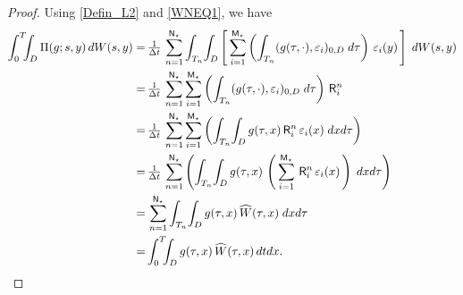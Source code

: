 \documentclass[10pt]{amsart}
\numberwithin{equation}{section}
\begin{document}
\begin{proof}
Using \eqref{Defin_L2} and \eqref{WNEQ1}, we have
\begin{equation*}
\begin{split}
\int_0^{{\scriptscriptstyle} T}\!\!\!\int_{{\scriptscriptstyle} D}\Pi(g;s,y)\,dW(s,y)=&\,
\tfrac{1}{\Delta{t}}\,\sum_{n=1}^{{\scriptscriptstyle}{\sf N}_{\star}}\int_{{\scriptscriptstyle} T_n}\!\int_{{\scriptscriptstyle} D}\left[
\,\sum_{i=1}^{{\scriptscriptstyle} {\sf M}_{\star}}
\left(\int_{{\scriptscriptstyle} T_n}(g(\tau,\cdot),\varepsilon_i)_{{\scriptscriptstyle} 0,D}\;d\tau\right)\,
\varepsilon_i(y)\,\right]\;dW(s,y)\\
=&\,
\tfrac{1}{\Delta{t}}\,\sum_{n=1}^{{\scriptscriptstyle}{\sf N}_{\star}}
\sum_{i=1}^{{\scriptscriptstyle} {\sf M}_{\star}}
\left(\int_{{\scriptscriptstyle} T_n}(g(\tau,\cdot),\varepsilon_i)_{{\scriptscriptstyle} 0,D}\;d\tau\right)\,{\sf R}^n_i\\
=&\,
\tfrac{1}{\Delta{t}}\,\sum_{n=1}^{{\scriptscriptstyle}{\sf N}_{\star}}
\sum_{i=1}^{{\scriptscriptstyle} {\sf M}_{\star}}\left(
\int_{{\scriptscriptstyle} T_n}\!\int_{{\scriptscriptstyle} D}g(\tau,x)
\,{\sf R}^n_i\,\varepsilon_i(x)\;dxd\tau\right)\\
=&\,
\tfrac{1}{\Delta{t}}\,\sum_{n=1}^{{\scriptscriptstyle}{\sf N}_{\star}}\left(
\int_{{\scriptscriptstyle} T_n}\!\int_{{\scriptscriptstyle} D}
g(\tau,x)\,\left(\,\sum_{i=1}^{{\scriptscriptstyle}{\sf M}_{\star}}
\,{\sf R}^n_i\,\varepsilon_i(x)\,\right)\;dxd\tau\right)\\
=&\,\sum_{n=1}^{{\scriptscriptstyle}{\sf N}_{\star}}
\int_{{\scriptscriptstyle} T_n}\!\int_{{\scriptscriptstyle} D}
g(\tau,x)\,{\widehat W}(\tau,x)\;dxd\tau\\
=&\int_0^{{\scriptscriptstyle} T}\!\!\!\int_{{\scriptscriptstyle} D}g(\tau,x) \,{\widehat
W}(\tau,x)\,dtdx.
\end{split}
\end{equation*}
\end{proof}
\end{document}
